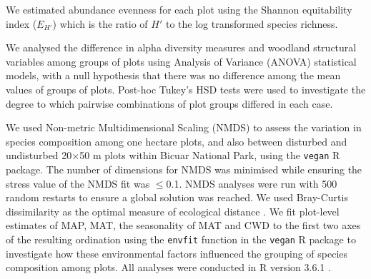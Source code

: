 \documentclass[diversity,article,submit,moreauthors,pdftex]{Definitions/mdpi}
\begin{document}
We estimated abundance evenness for each plot using the Shannon equitability index ($E_{H'}$) \citep{Smith1996} which is the ratio of $H'$ to the log transformed species richness.

We analysed the difference in alpha diversity measures and woodland structural variables among groups of plots using Analysis of Variance (ANOVA) statistical models, with a null hypothesis that there was no difference among the mean values of groups of plots. Post-hoc Tukey's HSD tests were used to investigate the degree to which pairwise combinations of plot groups differed in each case.

We used Non-metric Multidimensional Scaling (NMDS) to assess the variation in species composition among one hectare plots, and also between disturbed and undisturbed 20$\times$50 m plots within Bicuar National Park, using the \texttt{vegan} R package. The number of dimensions for NMDS was minimised while ensuring the stress value of the NMDS fit was $\le$0.1. NMDS analyses were run with 500 random restarts to ensure a global solution was reached. We used Bray-Curtis dissimilarity as the optimal measure of ecological distance \citep{Legendre2013}. We fit plot-level estimates of MAP, MAT, the seasonality of MAT and CWD to the first two axes of the resulting ordination using the \texttt{envfit} function in the \texttt{vegan} R package to investigate how these environmental factors influenced the grouping of species composition among plots. All analyses were conducted in R version 3.6.1 \citep{RCoreTeam2019}.


\end{document}
